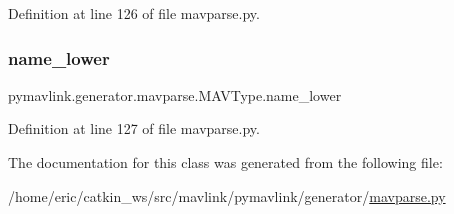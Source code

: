 Definition at line 126 of file mavparse.\+py.

\mbox{\label{classpymavlink_1_1generator_1_1mavparse_1_1MAVType_a2c3404ee30d62d976b474f797c3ebae1}} 
\subsubsection{\texorpdfstring{name\_lower}{name\_lower}}
{\footnotesize\ttfamily pymavlink.\+generator.\+mavparse.\+M\+A\+V\+Type.\+name\+\_\+lower}



Definition at line 127 of file mavparse.\+py.



The documentation for this class was generated from the following file\+:\begin{DoxyCompactItemize}
\item 
/home/eric/catkin\+\_\+ws/src/mavlink/pymavlink/generator/\mbox{\hyperlink{mavparse_8py}{mavparse.\+py}}\end{DoxyCompactItemize}
